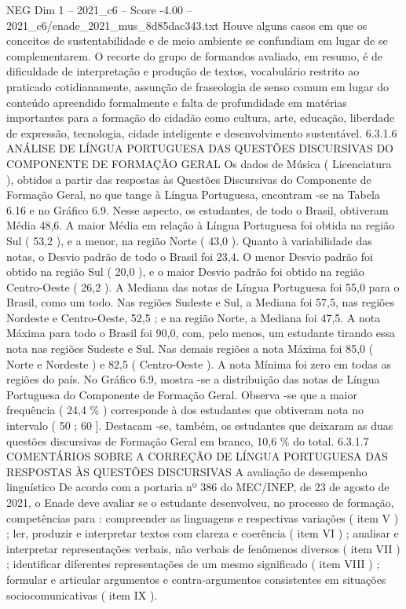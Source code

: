 \begin{textsample}{NEG Dim 1 – 2021\_c6 – Score -4.00 – 2021\_c6/enade\_2021\_mus\_8d85dac343.txt}
Houve alguns casos em que os conceitos de sustentabilidade e de meio ambiente se confundiam em lugar de se complementarem.
O recorte do grupo de formandos avaliado, em resumo, é de dificuldade de interpretação e produção de textos, vocabulário restrito ao praticado cotidianamente, assunção de fraseologia de senso comum em lugar do conteúdo apreendido formalmente e falta de profundidade em matérias importantes para a formação do cidadão como cultura, arte, educação, liberdade de expressão, tecnologia, cidade inteligente e desenvolvimento sustentável. 6.3.1.6 ANÁLISE DE LÍNGUA PORTUGUESA DAS QUESTÕES DISCURSIVAS DO COMPONENTE DE FORMAÇÃO GERAL Os dados de Música ( Licenciatura ), obtidos a partir das respostas às Questões Discursivas do Componente de Formação Geral, no que tange à Língua Portuguesa, encontram -se na Tabela 6.16 e no Gráfico 6.9.
Nesse aspecto, os estudantes, de todo o Brasil, obtiveram Média 48,6.
A maior Média em relação à Língua Portuguesa foi obtida na região Sul ( 53,2 ), e a menor, na região Norte ( 43,0 ).
Quanto à variabilidade das notas, o Desvio padrão de todo o Brasil foi 23,4.
O menor Desvio padrão foi obtido na região Sul ( 20,0 ), e o maior Desvio padrão foi obtido na região Centro-Oeste ( 26,2 ).
A Mediana das notas de Língua Portuguesa foi 55,0 para o Brasil, como um todo.
Nas regiões Sudeste e Sul, a Mediana foi 57,5, nas regiões Nordeste e Centro-Oeste, 52,5 ; e na região Norte, a Mediana foi 47,5.
A nota Máxima para todo o Brasil foi 90,0, com, pelo menos, um estudante tirando essa nota nas regiões Sudeste e Sul.
Nas demais regiões a nota Máxima foi 85,0 ( Norte e Nordeste ) e 82,5 ( Centro-Oeste ).
A nota Mínima foi zero em todas as regiões do país.
No Gráfico 6.9, mostra -se a distribuição das notas de Língua Portuguesa do Componente de Formação Geral.
Observa -se que a maior frequência ( 24,4 \% ) corresponde à dos estudantes que obtiveram nota no intervalo ( 50 ; 60 ].
Destacam -se, também, os estudantes que deixaram as duas questões discursivas de Formação Geral em branco, 10,6 \% do total. 6.3.1.7 COMENTÁRIOS SOBRE A CORREÇÃO DE LÍNGUA PORTUGUESA DAS RESPOSTAS ÀS QUESTÕES DISCURSIVAS A avaliação de desempenho linguístico De acordo com a portaria nº 386 do MEC/INEP, de 23 de agosto de 2021, o Enade deve avaliar se o estudante desenvolveu, no processo de formação, competências para : compreender as linguagens e respectivas variações ( item V ) ; ler, produzir e interpretar textos com clareza e coerência ( item VI ) ; analisar e interpretar representações verbais, não verbais de fenômenos diversos ( item VII ) ; identificar diferentes representações de um mesmo significado ( item VIII ) ; formular e articular argumentos e contra-argumentos consistentes em situações sociocomunicativas ( item IX ).

\end{textsample}
